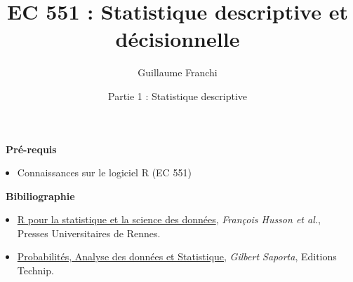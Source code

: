 \documentclass[aspectratio=169,xcolor=dvipsnames]{beamer}
\title[short title]{EC 551 : Statistique descriptive et décisionnelle}
\author[Surname]{Guillaume Franchi}
\institute[CBI]{Cursus Ingénieur $1^{\text{ère}}$ année}
\date{\textcolor{nyublue}{Partie 1 : Statistique descriptive}}
\begin{document}
\begin{frame}[plain]

    \titlepage
    
\end{frame}

%
%
%    

\begin{frame}[plain]

\textcolor{nyubluedarker}{{\Large \faCogs \ \textbf{Pré-requis}}}
	\begin{itemize}
	\item Connaissances sur le logiciel R (EC 551)
	\end{itemize}
	
	\bigskip
	
\textcolor{nyubluedarker}{{\Large \faBook \ \textbf{Bibiliographie}}}
		\begin{itemize}
	\item  \underline{R pour la statistique et la science des données}, \textit{François Husson et al.}, Presses Universitaires de Rennes.
	\item \underline{Probabilités, Analyse des données et Statistique}, \textit{Gilbert Saporta}, Editions Technip.
	\end{itemize}

\end{frame}
\end{document}
